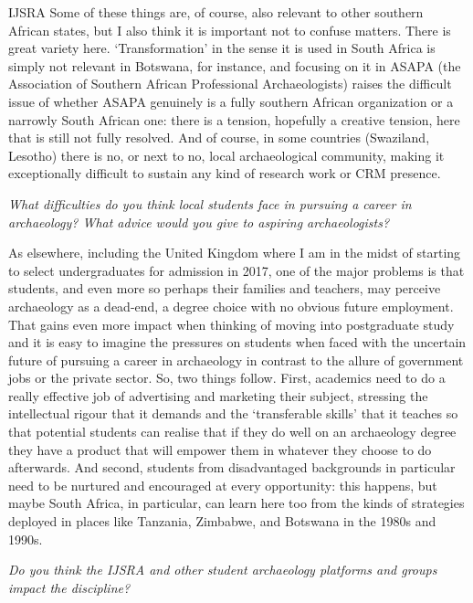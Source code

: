 \documentclass[%
	]{ijsra}
\begin{document}
\begin{labeling}{IJSRA}
Some of these things are, of course, also relevant to other southern African states, but I also think it is important not to confuse matters. There is great variety here. ‘Transformation’ in the sense it is used in South Africa is simply not relevant in Botswana, for instance, and focusing on it in ASAPA (the Association of Southern African Professional Archaeologists) raises the difficult issue of whether ASAPA genuinely is a fully southern African organization or a narrowly South African one: there is a tension, hopefully a creative tension, here that is still not fully resolved. And of course, in some countries (Swaziland, Lesotho) there is no, or next to no, local archaeological community, making it exceptionally difficult to sustain any kind of research work or CRM presence.

\item[IJSRA] \emph{What difficulties do you think local students face in pursuing a career in archaeology? What advice would you give to aspiring archaeologists?}
	
\item[PM] As elsewhere, including the United Kingdom where I am in the midst of starting to select undergraduates for admission in 2017, one of the major problems is that students, and even more so perhaps their families and teachers, may perceive archaeology as a dead-end, a degree choice with no obvious future employment. That gains even more impact when thinking of moving into postgraduate study and it is easy to imagine the pressures on students when faced with the uncertain future of pursuing a career in archaeology in contrast to the allure of government jobs or the private sector. So, two things follow. First, academics need to do a really effective job of advertising and marketing their subject, stressing the intellectual rigour that it demands and the ‘transferable skills’ that it teaches so that potential students can realise that if they do well on an archaeology degree they have a product that will empower them in whatever they choose to do afterwards. And second, students from disadvantaged backgrounds in particular need to be nurtured and encouraged at every opportunity: this happens, but maybe South Africa, in particular, can learn here too from the kinds of strategies deployed in places like Tanzania, Zimbabwe, and Botswana in the 1980s and 1990s.

\item[IJSRA] \emph{Do you think the IJSRA and other student archaeology platforms and groups impact the discipline?}
	

\end{labeling}
\end{document}
